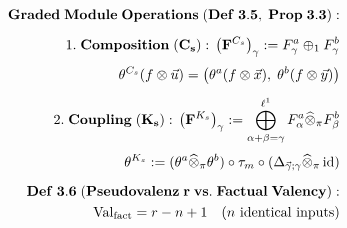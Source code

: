 \documentclass[preview]{standalone}
\begin{document}
\begin{align*}
\special{dvisvgm:raw <g id='unique000'>}\mathbf{Graded\;Module\;Operations\;(Def\;3.5,\;Prop\;3.3):}\\[5pt]1.\;\mathbf{Composition\;(C_s):}\;\left(\mathbf{F}^{C_s}\right)_\gamma := F_\gamma^a \oplus_1 F_\gamma^b\\[3pt]\;\;\theta^{C_s}(f\otimes\vec{u}) = \big(\theta^a(f\otimes\vec{x}),\; \theta^b(f\otimes\vec{y})\big)\\[5pt]2.\;\mathbf{Coupling\;(K_s):}\;\left(\mathbf{F}^{K_s}\right)_\gamma := \bigoplus_{\alpha+\beta=\gamma}^{\ell^1} F_\alpha^a\widehat{\otimes}_\pi F_\beta^b\\[3pt]\;\;\theta^{K_s} := (\theta^a\widehat{\otimes}_\pi\theta^b)\circ\tau_m\circ(\Delta_{\vec{\gamma};\gamma}\widehat{\otimes}_\pi\operatorname{id})\\[6pt]\mathbf{Def\;3.6\;(Pseudovalenz\;r\;vs.\;Factual\;Valency):}\\\operatorname{Val}_{\text{fact}} = r - n + 1\quad (n\text{ identical inputs})\special{dvisvgm:raw </g>}
\end{align*}
\end{document}

